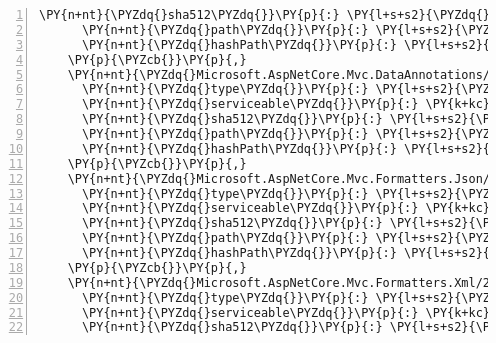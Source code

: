 \begin{Verbatim}[commandchars=\\\{\},numbers=left,firstnumber=1,stepnumber=1,numberblanklines=0]
      \PY{n+nt}{\PYZdq{}sha512\PYZdq{}}\PY{p}{:} \PY{l+s+s2}{\PYZdq{}sha512\PYZhy{}XVAMOEA0X1vjeA7OHz85DV+DWFapNfc9B8laL9aMQUmBTy5PQfzzaS/Xxfg9befMeGsvewy7UEfGA26NVeNbhg==\PYZdq{}}\PY{p}{,}
      \PY{n+nt}{\PYZdq{}path\PYZdq{}}\PY{p}{:} \PY{l+s+s2}{\PYZdq{}microsoft.aspnetcore.mvc.cors/2.1.0\PYZhy{}rc1\PYZhy{}final\PYZdq{}}\PY{p}{,}
      \PY{n+nt}{\PYZdq{}hashPath\PYZdq{}}\PY{p}{:} \PY{l+s+s2}{\PYZdq{}microsoft.aspnetcore.mvc.cors.2.1.0\PYZhy{}rc1\PYZhy{}final.nupkg.sha512\PYZdq{}}
    \PY{p}{\PYZcb{}}\PY{p}{,}
    \PY{n+nt}{\PYZdq{}Microsoft.AspNetCore.Mvc.DataAnnotations/2.1.0\PYZhy{}rc1\PYZhy{}final\PYZdq{}}\PY{p}{:} \PY{p}{\PYZob{}}
      \PY{n+nt}{\PYZdq{}type\PYZdq{}}\PY{p}{:} \PY{l+s+s2}{\PYZdq{}package\PYZdq{}}\PY{p}{,}
      \PY{n+nt}{\PYZdq{}serviceable\PYZdq{}}\PY{p}{:} \PY{k+kc}{true}\PY{p}{,}
      \PY{n+nt}{\PYZdq{}sha512\PYZdq{}}\PY{p}{:} \PY{l+s+s2}{\PYZdq{}sha512\PYZhy{}HpDAPDesQjsEpfk3PgG1r1bAxPGVSNW+8ZSBE1F+Jex3jyuCfFcaMAj02aywntO+hTtYS0/NEjSDN6fukWYW5Q==\PYZdq{}}\PY{p}{,}
      \PY{n+nt}{\PYZdq{}path\PYZdq{}}\PY{p}{:} \PY{l+s+s2}{\PYZdq{}microsoft.aspnetcore.mvc.dataannotations/2.1.0\PYZhy{}rc1\PYZhy{}final\PYZdq{}}\PY{p}{,}
      \PY{n+nt}{\PYZdq{}hashPath\PYZdq{}}\PY{p}{:} \PY{l+s+s2}{\PYZdq{}microsoft.aspnetcore.mvc.dataannotations.2.1.0\PYZhy{}rc1\PYZhy{}final.nupkg.sha512\PYZdq{}}
    \PY{p}{\PYZcb{}}\PY{p}{,}
    \PY{n+nt}{\PYZdq{}Microsoft.AspNetCore.Mvc.Formatters.Json/2.1.0\PYZhy{}rc1\PYZhy{}final\PYZdq{}}\PY{p}{:} \PY{p}{\PYZob{}}
      \PY{n+nt}{\PYZdq{}type\PYZdq{}}\PY{p}{:} \PY{l+s+s2}{\PYZdq{}package\PYZdq{}}\PY{p}{,}
      \PY{n+nt}{\PYZdq{}serviceable\PYZdq{}}\PY{p}{:} \PY{k+kc}{true}\PY{p}{,}
      \PY{n+nt}{\PYZdq{}sha512\PYZdq{}}\PY{p}{:} \PY{l+s+s2}{\PYZdq{}sha512\PYZhy{}d7XUyDstiFWBnUsniF+6dNpLVlk8f/Fi2/gvDNshriteFgTIBVJVzsMJEY8G5kK91o5aKvRm6xPiKnt0fjZxiQ==\PYZdq{}}\PY{p}{,}
      \PY{n+nt}{\PYZdq{}path\PYZdq{}}\PY{p}{:} \PY{l+s+s2}{\PYZdq{}microsoft.aspnetcore.mvc.formatters.json/2.1.0\PYZhy{}rc1\PYZhy{}final\PYZdq{}}\PY{p}{,}
      \PY{n+nt}{\PYZdq{}hashPath\PYZdq{}}\PY{p}{:} \PY{l+s+s2}{\PYZdq{}microsoft.aspnetcore.mvc.formatters.json.2.1.0\PYZhy{}rc1\PYZhy{}final.nupkg.sha512\PYZdq{}}
    \PY{p}{\PYZcb{}}\PY{p}{,}
    \PY{n+nt}{\PYZdq{}Microsoft.AspNetCore.Mvc.Formatters.Xml/2.1.0\PYZhy{}rc1\PYZhy{}final\PYZdq{}}\PY{p}{:} \PY{p}{\PYZob{}}
      \PY{n+nt}{\PYZdq{}type\PYZdq{}}\PY{p}{:} \PY{l+s+s2}{\PYZdq{}package\PYZdq{}}\PY{p}{,}
      \PY{n+nt}{\PYZdq{}serviceable\PYZdq{}}\PY{p}{:} \PY{k+kc}{true}\PY{p}{,}
      \PY{n+nt}{\PYZdq{}sha512\PYZdq{}}\PY{p}{:} \PY{l+s+s2}{\PYZdq{}sha512\PYZhy{}gIyZ1yEPvmFKqPpE10JN6A4F+ttTSn/Vo7xAZ5FvG92f+T/KpU+/45VzZfgwNgR6/puQqEvbH8Sz8UyoQSL8VA==\PYZdq{}}\PY{p}{,}

\end{Verbatim}
